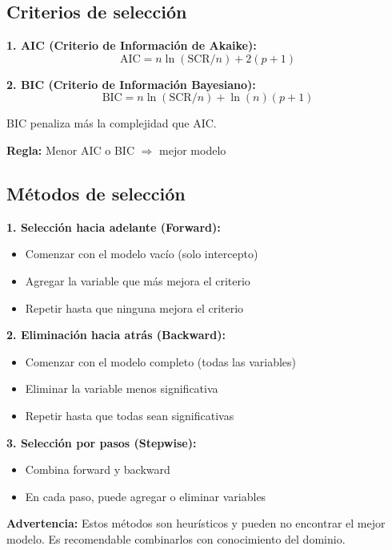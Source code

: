 \documentclass[11pt,a4paper]{article}
\begin{document}
\subsection{Criterios de selección}

\textbf{1. AIC (Criterio de Información de Akaike):}
\begin{equation}
\text{AIC} = n \ln(\text{SCR}/n) + 2(p + 1)
\end{equation}

\textbf{2. BIC (Criterio de Información Bayesiano):}
\begin{equation}
\text{BIC} = n \ln(\text{SCR}/n) + \ln(n)(p + 1)
\end{equation}

BIC penaliza más la complejidad que AIC.

\textbf{Regla:} Menor AIC o BIC $\Rightarrow$ mejor modelo

\subsection{Métodos de selección}

\textbf{1. Selección hacia adelante (Forward):}
\begin{itemize}
    \item Comenzar con el modelo vacío (solo intercepto)
    \item Agregar la variable que más mejora el criterio
    \item Repetir hasta que ninguna mejora el criterio
\end{itemize}

\textbf{2. Eliminación hacia atrás (Backward):}
\begin{itemize}
    \item Comenzar con el modelo completo (todas las variables)
    \item Eliminar la variable menos significativa
    \item Repetir hasta que todas sean significativas
\end{itemize}

\textbf{3. Selección por pasos (Stepwise):}
\begin{itemize}
    \item Combina forward y backward
    \item En cada paso, puede agregar o eliminar variables
\end{itemize}

\textbf{Advertencia:} Estos métodos son heurísticos y pueden no encontrar el mejor modelo. Es recomendable combinarlos con conocimiento del dominio.
\end{document}
